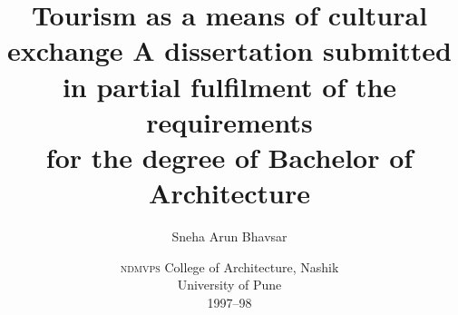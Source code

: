 \documentclass[a5paper,10pt,twoside]{book}
\title{
  Tourism as a means of cultural exchange
  \newline
  \newline
  \small{
  A dissertation submitted in partial fulfilment of the requirements\\
  for the degree of Bachelor of Architecture
  }
}
\author{Sneha Arun Bhavsar}
\date{
    \small{
    \textsc{ndmvps} College of Architecture, Nashik\\
    University of Pune\\
    1997--98
  }
}
\begin{document}
  \maketitle

  \pagebreak

  \tableofcontents
  
  \listoffigures
  

  \vfill
  
  \pagebreak

    
  
  
  
  
\end{document}
